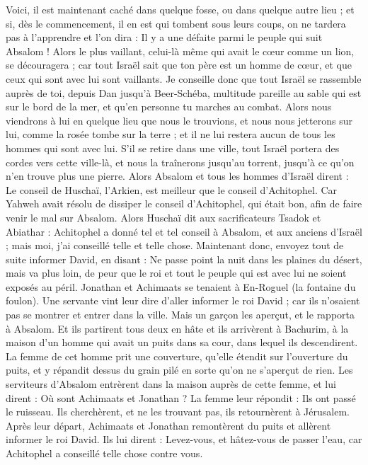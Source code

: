 \begin{multicols}{2}
Voici, il est maintenant caché dans quelque fosse, ou dans quelque autre lieu ; et si, dès le commencement, il en est qui tombent sous leurs coups, on ne tardera pas à l'apprendre et l'on dira : Il y a une défaite parmi le peuple qui suit Absalom !
Alors le plus vaillant, celui-là même qui avait le cœur comme un lion, se découragera ; car tout Israël sait que ton père est un homme de cœur, et que ceux qui sont avec lui sont vaillants.
Je conseille donc que tout Israël se rassemble auprès de toi, depuis Dan jusqu'à Beer-Schéba, multitude pareille au sable qui est sur le bord de la mer, et qu'en personne tu marches au combat.
Alors nous viendrons à lui en quelque lieu que nous le trouvions, et nous nous jetterons sur lui, comme la rosée tombe sur la terre ; et il ne lui restera aucun de tous les hommes qui sont avec lui.
S'il se retire dans une ville, tout Israël portera des cordes vers cette ville-là, et nous la traînerons jusqu'au torrent, jusqu'à ce qu'on n'en trouve plus une pierre.
Alors Absalom et tous les hommes d'Israël dirent : Le conseil de Huschaï, l'Arkien, est meilleur que le conseil d'Achitophel. Car Yahweh avait résolu de dissiper le conseil d'Achitophel, qui était bon, afin de faire venir le mal sur Absalom.
Alors Huschaï dit aux sacrificateurs Tsadok et Abiathar : Achitophel a donné tel et tel conseil à Absalom, et aux anciens d'Israël ; mais moi, j'ai conseillé telle et telle chose.
Maintenant donc, envoyez tout de suite informer David, en disant : Ne passe point la nuit dans les plaines du désert, mais va plus loin, de peur que le roi et tout le peuple qui est avec lui ne soient exposés au péril.
Jonathan et Achimaats se tenaient à En-Roguel (la fontaine du foulon). Une servante vint leur dire d'aller informer le roi David ; car ils n'osaient pas se montrer et entrer dans la ville.
Mais un garçon les aperçut, et le rapporta à Absalom. Et ils partirent tous deux en hâte et ils arrivèrent à Bachurim, à la maison d'un homme qui avait un puits dans sa cour, dans lequel ils descendirent.
La femme de cet homme prit une couverture, qu'elle étendit sur l'ouverture du puits, et y répandit dessus du grain pilé en sorte qu'on ne s'aperçut de rien.
Les serviteurs d'Absalom entrèrent dans la maison auprès de cette femme, et lui dirent : Où sont Achimaats et Jonathan ? La femme leur répondit : Ils ont passé le ruisseau. Ils cherchèrent, et ne les trouvant pas, ils retournèrent à Jérusalem.
Après leur départ, Achimaats et Jonathan remontèrent du puits et allèrent informer le roi David. Ils lui dirent : Levez-vous, et hâtez-vous de passer l'eau, car Achitophel a conseillé telle chose contre vous.

\end{multicols}
